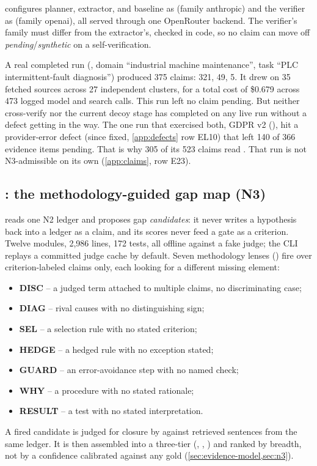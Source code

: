  configures planner, extractor, and baseline as
 (family anthropic) and the verifier as 
(family openai), all served through one OpenRouter backend. The verifier's family must differ from
the extractor's, checked in code, so no claim can move off \emph{pending}/\emph{synthetic} on a
self-verification.

A real completed run (, domain
\enquote{industrial machine maintenance}, task \enquote{PLC intermittent-fault diagnosis}) produced
375 claims:  321,  49,
 5. It drew on 35 fetched sources across 27 independent clusters, for a total cost of
\$0.679 across 473 logged model and search calls. \evobs{} This run left no claim pending. But
neither cross-verify nor the current decoy stage has completed on any live run without a defect
getting in the way. The one run that exercised both, GDPR v2
(), hit a provider-error defect (since fixed,
\cref{app:defects} row EL10) that left 140 of 366 evidence items pending. That is why 305 of its
523 claims read . That run is not N3-admissible on its own
(\cref{app:claims}, row E23).

\subsection{: the methodology-guided gap map (N3)}

 reads one N2 ledger and proposes gap \emph{candidates}: it never writes a
hypothesis back into a ledger as a claim, and its scores never feed a gate as a criterion. Twelve
modules, 2{,}986 lines, 172 tests, all offline against a fake judge; the CLI replays a committed
judge cache by default. Seven methodology lenses () fire over criterion-labeled
claims only, each looking for a different missing element:
\begin{itemize}[noitemsep]
  \item \textbf{DISC} -- a judged term attached to multiple claims, no discriminating case;
  \item \textbf{DIAG} -- rival causes with no distinguishing sign;
  \item \textbf{SEL} -- a selection rule with no stated criterion;
  \item \textbf{HEDGE} -- a hedged rule with no exception stated;
  \item \textbf{GUARD} -- an error-avoidance step with no named check;
  \item \textbf{WHY} -- a procedure with no stated rationale;
  \item \textbf{RESULT} -- a test with no stated interpretation.
\end{itemize}
A fired candidate is judged for closure by  against retrieved
sentences from the same ledger. It is then assembled into a three-tier 
(, , ) and ranked by breadth, not by a
confidence calibrated against any gold (\cref{sec:evidence-model,sec:n3}).

